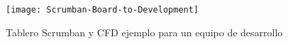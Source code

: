 \begin{figure}[h]
  \centering
  \texttt{[image: Scrumban-Board-to-Development]}
  \caption{Tablero Scrumban y CFD ejemplo para un equipo de desarrollo}
  \centering
  \label{fig:Scrumban-Board-to-Development} %
\end{figure}
\FloatBarrier %
